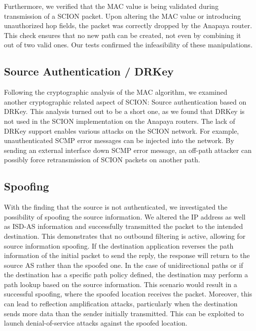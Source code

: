 Furthermore, we verified that the MAC value is being validated during transmission of a SCION packet.
Upon altering the MAC value or introducing unauthorized hop fields, the packet was correctly dropped by the Anapaya router.
This check ensures that no new path can be created, not even by combining it out of two valid ones.
Our tests confirmed the infeasibility of these manipulations.



\subsection{Source Authentication / DRKey}
Following the cryptographic analysis of the MAC algorithm, we examined another cryptographic related aspect of SCION: Source authentication based on DRKey.
This analysis turned out to be a short one, as we found that DRKey is not used in the SCION implementation on the Anapaya routers.
The lack of DRKey support enables various attacks on the SCION network.
For example, unauthenticated SCMP error messages can be injected into the network.
By sending an external interface down SCMP error message, an off-path attacker can possibly force retransmission of SCION packets on another path.



\subsection{Spoofing}
With the finding that the source is not authenticated, we investigated the possibility of spoofing the source information.
We altered the IP address as well as ISD-AS information and successfully transmitted the packet to the intended destination.
This demonstrates that no outbound filtering is active, allowing for source information spoofing.
If the destination application reverses the path information of the initial packet to send the reply, the response will return to the source AS rather than the spoofed one.
In the case of unidirectional paths or if the destination has a specific path policy defined, the destination may perform a path lookup based on the source information.
This scenario would result in a successful spoofing, where the spoofed location receives the packet.
Moreover, this can lead to reflection amplification attacks, particularly when the destination sends more data than the sender initially transmitted.
This can be exploited to launch denial-of-service attacks against the spoofed location.

